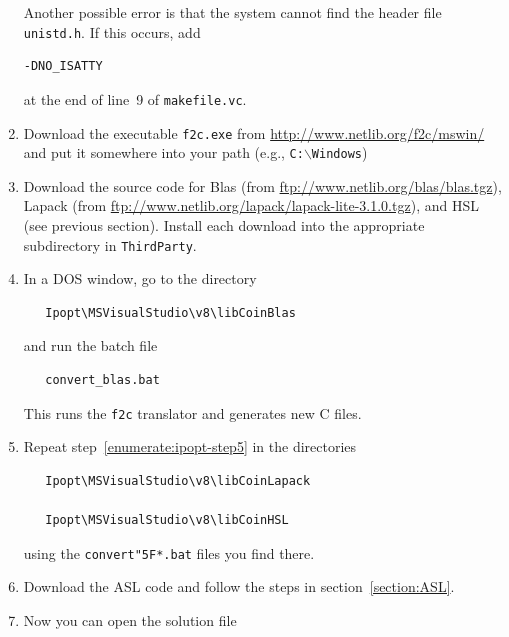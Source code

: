 \documentclass[11pt]{article}
\renewcommand{\_}{{\char"5F}}
\renewcommand{\{}{{\char"7B}}
\renewcommand{\}}{{\char"7D}}
\renewcommand{\^}{{\char"0D}}
\renewcommand{\'}{{\char"0D}}
\begin{document}
\begin{enumerate}
Another possible error is that the system cannot find the header file {\tt unistd.h}.
If this occurs, add

\begin{verbatim}
-DNO_ISATTY
\end{verbatim}

at the end of line~9 of {\tt makefile.vc}.

\item{} Download the executable {\tt f2c.exe} from \url{http://www.netlib.org/f2c/mswin/}
and put it somewhere into your path
   (e.g., {\tt C:$\backslash$Windows})

\item{} Download the source code for Blas (from \url{ftp://www.netlib.org/blas/blas.tgz}), 
Lapack (from \url{ftp://www.netlib.org/lapack/lapack-lite-3.1.0.tgz}), 
and HSL (see previous section).
Install each download into the appropriate subdirectory in {\tt ThirdParty}.

\item{} \label{enumerate:ipopt-step5}
In a DOS window, go to the directory

\begin{verbatim}
   Ipopt\MSVisualStudio\v8\libCoinBlas
\end{verbatim}

   and run the batch file

\begin{verbatim}
   convert_blas.bat
\end{verbatim}

   This runs the {\tt f2c} translator and generates new C files.%


\item{} Repeat step~\ref{enumerate:ipopt-step5} in the directories

\begin{verbatim}
   Ipopt\MSVisualStudio\v8\libCoinLapack

   Ipopt\MSVisualStudio\v8\libCoinHSL
\end{verbatim}

   using the {\tt convert\_*.bat} files you find there.

\item{}
   Download the ASL code and follow the steps in section~\ref{section:ASL}.

\item{}
Now you can open the solution file


\end{enumerate}
\end{document}
